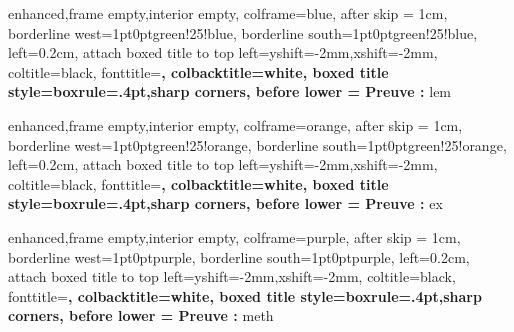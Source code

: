 {
    enhanced,frame empty,interior empty,
    colframe=blue,
    after skip = 1cm,
    borderline west={1pt}{0pt}{green!25!blue},
    borderline south={1pt}{0pt}{green!25!blue},
    left=0.2cm,
    attach boxed title to top left={yshift=-2mm,xshift=-2mm},
    coltitle=black,
    fonttitle=\bfseries,
    colbacktitle=white,
    boxed title style={boxrule=.4pt,sharp corners},
    before lower = {\textbf{Preuve :}\n}
}{lem}

{
    enhanced,frame empty,interior empty,
    colframe=orange,
    after skip = 1cm,
    borderline west={1pt}{0pt}{green!25!orange},
    borderline south={1pt}{0pt}{green!25!orange},
    left=0.2cm,
    attach boxed title to top left={yshift=-2mm,xshift=-2mm},
    coltitle=black,
    fonttitle=\bfseries,
    colbacktitle=white,
    boxed title style={boxrule=.4pt,sharp corners},
    before lower = {\textbf{Preuve :}\n}
}{ex}

{
    enhanced,frame empty,interior empty,
    colframe=purple,
    after skip = 1cm,
    borderline west={1pt}{0pt}{purple},
    borderline south={1pt}{0pt}{purple},
    left=0.2cm,
    attach boxed title to top left={yshift=-2mm,xshift=-2mm},
    coltitle=black,
    fonttitle=\bfseries,
    colbacktitle=white,
    boxed title style={boxrule=.4pt,sharp corners},
    before lower = {\textbf{Preuve :}\n}
}{meth}